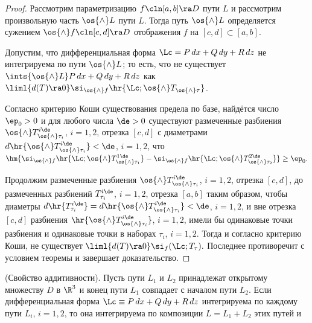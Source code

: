 \documentclass[a4paper]{article}
\begin{document}
\begin{proof}
Рассмотрим параметризацию $f\cln[a,b]\ra D$ пути $L$ и рассмотрим
произвольную часть $\os{\wedge}L$ пути $L$. Тогда путь
$\os{\wedge}L$ определяется сужением $\os{\wedge}f\cln[c,d]\ra D$
отображения $f$ на $[c,d]\subset[a,b]$.

Допустим, что дифференциальная форма $\Lc=P\,dx+Q\,dy+R\,dz$ не
интегрируема по пути $\os{\wedge}L$; то есть, что не существует
$\ints{\os{\wedge}L}P\,dx+Q\,dy+R\,dz$ как
$\liml{d(T)\ra0}\si_{\os{\wedge}f}
\hr{\Lc;\os{\wedge}T_{\os{\wedge}\tau}}$.

Согласно критерию Коши существования предела по базе, найдётся число
$\ep_0>0$ и для любого числа $\de>0$ существуют размеченные
разбиения $\os{\wedge}T^{i\de}_{\os{\wedge}\tau_i}$, $i=1,2$,
отрезка $[c,d]$ с диаметрами
$d\hr{\os{\wedge}T^{i\de}_{\os{\wedge}\tau_i}}<\de$, $i=1,2$, что
$\hm{\si_{\os{\wedge}f} {\hr{\Lc;
\os{\wedge}T^{1\de}_{\os{\wedge}\tau_1}} - \si_{\os{\wedge}f}
\hr{\Lc; \os{\wedge}T^{2\de}_{\os{\wedge}\tau_2}}}}\ge\ep_0.$

Продолжим размеченные разбиения
$\os{\wedge}T^{i\de}_{\os{\wedge}\tau_i}$, $i=1,2$, отрезка $[c,d]$,
до размеченных разбиений $T^{i\de}_{\tau_i}$, $i=1,2$, отрезка
$[a,b]$ таким образом, чтобы диаметры $d\hr{T^{i\de}_{\tau_i}} =
d\hr{\os{\wedge}T^{i\de}_{\os{\wedge}\tau_i}}<\de$, $i=1,2$, и вне
отрезка $[c,d]$ разбиения
$\hr{\os{\wedge}T^{i\de}_{\os{\wedge}\tau_i}}$, $i=1,2$, имели бы
одинаковые точки разбиения и одинаковые точки в наборах $\tau_i$,
$i=1,2$. Тогда  и согласно критерию Коши, не существует
$\liml{d(T)\ra0} \si_f(\Lc;T_{\tau}).$ Последнее противоречит с
условием теоремы и завершает доказательство.
\end{proof}

\begin{theorem}
(Свойство аддитивности). Пусть пути $L_1$ и $L_2$ принадлежат
открытому множеству $D$ в $\R^3$ и конец пути $L_1$ совпадает с
началом пути $L_2$. Если дифференциальная форма $\Lc \equiv P\,dx +
Q\,dy + R\,dz$ интегрируема по каждому пути $L_i$, $i=1,2$, то она
интегрируема по композиции $L=L_1+L_2$ этих путей и 
\end{theorem}
\end{document}
